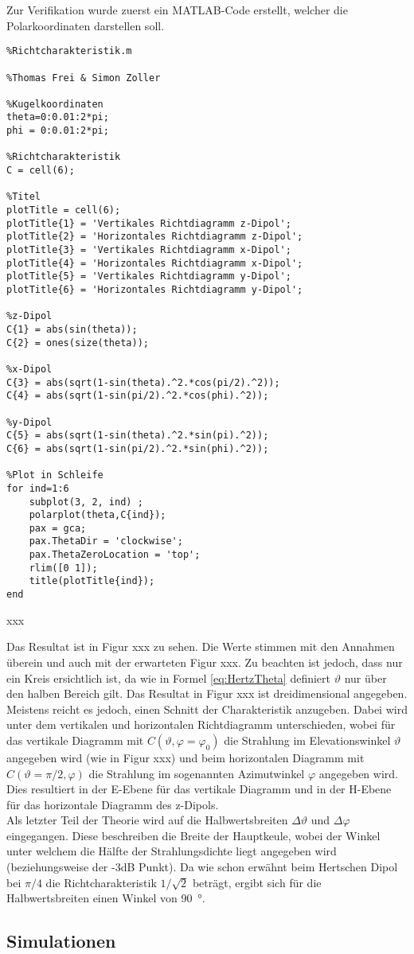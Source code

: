 Zur Verifikation wurde zuerst ein MATLAB-Code erstellt, welcher die Polarkoordinaten darstellen soll.

\begin{lstlisting}
%Richtcharakteristik.m

%Thomas Frei & Simon Zoller

%Kugelkoordinaten
theta=0:0.01:2*pi;
phi = 0:0.01:2*pi;

%Richtcharakteristik
C = cell(6);

%Titel
plotTitle = cell(6);
plotTitle{1} = 'Vertikales Richtdiagramm z-Dipol';
plotTitle{2} = 'Horizontales Richtdiagramm z-Dipol';
plotTitle{3} = 'Vertikales Richtdiagramm x-Dipol';
plotTitle{4} = 'Horizontales Richtdiagramm x-Dipol';
plotTitle{5} = 'Vertikales Richtdiagramm y-Dipol';
plotTitle{6} = 'Horizontales Richtdiagramm y-Dipol';

%z-Dipol
C{1} = abs(sin(theta));
C{2} = ones(size(theta));

%x-Dipol
C{3} = abs(sqrt(1-sin(theta).^2.*cos(pi/2).^2));
C{4} = abs(sqrt(1-sin(pi/2).^2.*cos(phi).^2));

%y-Dipol
C{5} = abs(sqrt(1-sin(theta).^2.*sin(pi).^2));
C{6} = abs(sqrt(1-sin(pi/2).^2.*sin(phi).^2));

%Plot in Schleife
for ind=1:6
    subplot(3, 2, ind) ;
    polarplot(theta,C{ind});
    pax = gca;
    pax.ThetaDir = 'clockwise';
    pax.ThetaZeroLocation = 'top';
    rlim([0 1]);
    title(plotTitle{ind});
end
\end{lstlisting}

xxx

Das Resultat ist in Figur xxx zu sehen. Die Werte stimmen mit den Annahmen überein und auch mit der erwarteten Figur xxx. Zu beachten ist jedoch, dass nur ein Kreis ersichtlich ist, da wie in Formel \ref{eq:HertzTheta} definiert $\vartheta$ nur über den halben Bereich gilt. Das Resultat in Figur xxx ist dreidimensional angegeben. Meistens reicht es jedoch, einen Schnitt der Charakteristik anzugeben. Dabei wird unter dem vertikalen und horizontalen Richtdiagramm unterschieden, wobei für das vertikale Diagramm mit $C(\vartheta, \varphi = \varphi_0)$ die Strahlung im Elevationswinkel $\vartheta$ angegeben wird (wie in Figur xxx) und beim horizontalen Diagramm mit $C(\vartheta=\pi/2, \varphi)$ die Strahlung im sogenannten Azimutwinkel $\varphi$ angegeben wird. Dies resultiert in der E-Ebene für das vertikale Diagramm und in der H-Ebene für das horizontale Diagramm des z-Dipols.\\

Als letzter Teil der Theorie wird auf die Halbwertsbreiten $\Delta \vartheta$ und $\Delta \varphi$ eingegangen. Diese beschreiben die Breite der Hauptkeule, wobei der Winkel unter welchem die Hälfte der Strahlungsdichte liegt angegeben wird (beziehungsweise der -3dB Punkt). Da wie schon erwähnt beim Hertschen Dipol bei $\pi/4$ die Richtcharakteristik $1/\sqrt{2}$ beträgt, ergibt sich für die Halbwertsbreiten einen Winkel von \SI{90}{\degree}.

\subsection{Simulationen}

